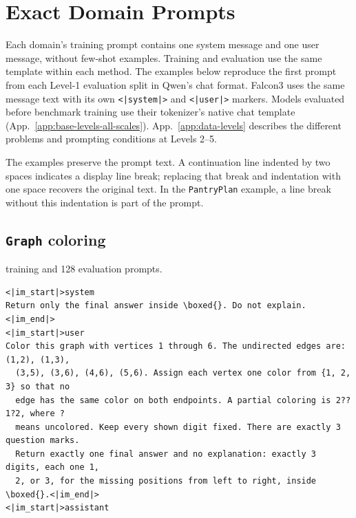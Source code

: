 \FloatBarrier
\section{Exact Domain Prompts}
\label{app:prompts}

Each domain's training prompt contains one system message and one user
message, without few-shot examples. Training and evaluation use the same
template within each method. The examples below reproduce the first prompt
from each Level-1 evaluation split in Qwen's chat format. Falcon3 uses the
same message text with its own \texttt{<|system|>} and \texttt{<|user|>}
markers. Models evaluated before benchmark training use their tokenizer's
native chat template (App.~\ref{app:base-levels-all-scales}).
App.~\ref{app:data-levels} describes the different problems and prompting
conditions at Levels 2--5.

The examples preserve the prompt text. A continuation line indented by two
spaces indicates a display line break; replacing that break and indentation
with one space recovers the original text. In the \texttt{PantryPlan}
example, a line break without this indentation is part of the prompt.


\filbreak
\subsection{\texttt{Graph} coloring}
\label{app:prompt-graph}

 training and 128 evaluation prompts.

\begin{Verbatim}[fontsize=\scriptsize,frame=single,framesep=4pt,rulecolor=\color{black!25},samepage=true]
<|im_start|>system
Return only the final answer inside \boxed{}. Do not explain.<|im_end|>
<|im_start|>user
Color this graph with vertices 1 through 6. The undirected edges are: (1,2), (1,3),
  (3,5), (3,6), (4,6), (5,6). Assign each vertex one color from {1, 2, 3} so that no
  edge has the same color on both endpoints. A partial coloring is 2??1?2, where ?
  means uncolored. Keep every shown digit fixed. There are exactly 3 question marks.
  Return exactly one final answer and no explanation: exactly 3 digits, each one 1,
  2, or 3, for the missing positions from left to right, inside \boxed{}.<|im_end|>
<|im_start|>assistant
\end{Verbatim}

